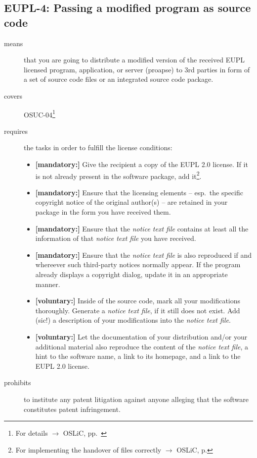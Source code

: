 \subsection{EUPL-4: Passing a modified program as source code}
\label{OSUC-04-EUPL} 

\begin{description}
\item[means] that you are going to distribute a modified version of the received
EUPL licensed program, application, or server (proapse) to 3rd parties in form
of a set of source code files or an integrated source code package.
\item[covers] OSUC-04\footnote{For details $\rightarrow$ OSLiC, pp.\ \pageref{OSUC-04-DEF}}
\item[requires] the tasks in order to fulfill the license conditions:
\begin{itemize}
  
  \item \textbf{[mandatory:]} Give the recipient a copy of the EUPL 2.0
  license. If it is not already present in the software package, add
  it\footnote{For implementing the handover of files correctly $\rightarrow$
  OSLiC, p. \pageref{DistributingFilesHint}}.

  \item \textbf{[mandatory:]} Ensure that the licensing elements -- esp.\ the
  specific copyright notice of the original author(s) -- are retained in your
  package in the form you have received them.
  
  \item \textbf{[mandatory:]} Ensure that the \emph{notice text file} contains at least
  all the information of that \emph{notice text file} you have received.

  \item \textbf{[mandatory:]} Ensure that the \emph{notice text file} is also
  reproduced if and whereever such third-party notices normally appear. If the
  program already displays a copyright dialog, update it in an appropriate
  manner.
  
  \item \textbf{[voluntary:]} Inside of the source code, mark all your
  modifications thoroughly. Generate a \emph{notice text file}, if it still does not
  exist. Add (sic!) a description of your modifications into the \emph{notice text file}.
   
  \item \textbf{[voluntary:]} Let the documentation of your distribution and/or
  your additional material also reproduce the content of the \emph{notice text
  file}, a hint to the software name, a link to its homepage, and a link to the
  EUPL 2.0 license.
  
 \end{itemize}
 
\item[prohibits] to institute any patent litigation against anyone alleging that
the software constitutes patent infringement.

\end{description}

